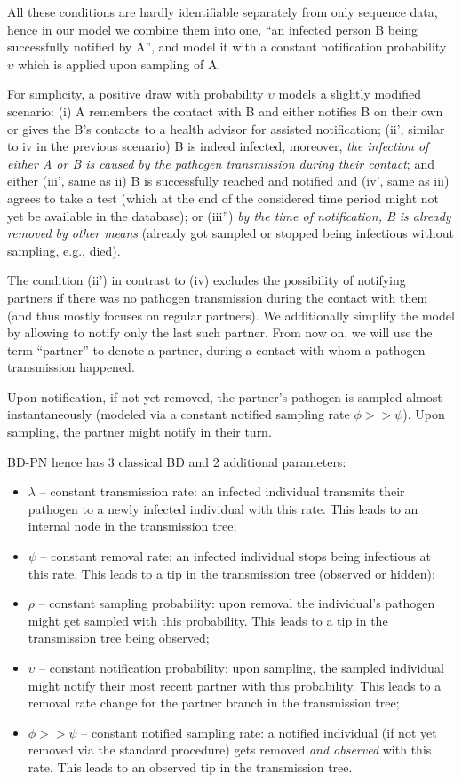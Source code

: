 \documentclass[10pt,letterpaper]{article}
\begin{document}
All these conditions are hardly identifiable separately from only sequence data, hence in our model we combine them into one, ``an infected person B being successfully notified by A'', and model it with a constant notification probability $\upsilon$ which is applied upon sampling of A. 

For simplicity, a positive draw with probability $\upsilon$ models a slightly modified scenario: (i) A remembers the contact with B and  either notifies B on their own or gives the B's contacts to a health advisor for assisted notification; (ii', similar to iv in the previous scenario) B is indeed infected, moreover, \textit{the infection of either A or B is caused by the pathogen transmission during their contact};  and either (iii', same as ii) B is successfully reached and notified and (iv', same as iii) agrees to take a test (which at the end of the considered time period might not yet be available in the database); or (iii'') \textit{by the time of notification, B is already removed by other means} (already got sampled or stopped being infectious without sampling, e.g., died).

The condition (ii') in contrast to (iv) excludes the possibility of notifying partners if there was no pathogen transmission during the contact with them (and thus mostly focuses on regular partners). We additionally simplify the model by allowing to notify only the last such partner. From now on, we will use the term ``partner'' to denote a partner, during a contact with whom a pathogen transmission happened.

Upon notification, if not yet removed,  the partner's pathogen is sampled almost instantaneously (modeled via a constant notified sampling rate $\phi >> \psi$). Upon sampling, the partner might notify in their turn. 

BD-PN hence has 3 classical BD and 2 additional parameters:
\begin{itemize}
 \item $\lambda$ -- constant transmission rate: an infected individual transmits their pathogen to a newly infected individual with this rate. This leads to an internal node in the transmission tree;
 \item $\psi$ -- constant removal rate: an infected individual stops being infectious at this rate. This leads to a tip in the transmission tree (observed or hidden);
 \item $\rho$ -- constant sampling probability: upon removal the individual's pathogen might get sampled with this probability. This leads to a tip in the transmission tree being observed;
 \item $\upsilon$ -- constant notification probability: upon sampling, the sampled individual might notify their most recent partner with this probability. This leads to a removal rate change for the partner branch in the transmission tree;
 \item $\phi >> \psi$ -- constant notified sampling rate: a notified individual (if not yet removed via the standard procedure) gets removed \textit{and observed} with this rate. This leads to an observed tip in the transmission tree. 
\end{itemize}
\end{document}
